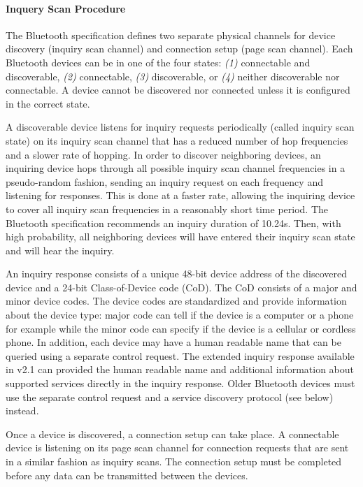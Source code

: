 \paragraph*{Inquery Scan Procedure}

The Bluetooth specification defines two separate physical channels for device discovery (inquiry scan channel) and connection setup (page scan channel).  Each Bluetooth devices can be in one of the four states: \emph{(1)} connectable and discoverable, \emph{(2)} connectable, \emph{(3)} discoverable, or \emph{(4)} neither discoverable nor connectable. A device cannot be discovered nor connected unless it is configured in the correct state.

A discoverable device listens for inquiry requests periodically (called inquiry scan state) on its inquiry scan channel that has a reduced number of hop frequencies and a slower rate of hopping. In order to discover neighboring devices, an inquiring device hops through all possible inquiry scan channel frequencies in a pseudo-random fashion, sending an inquiry request on each frequency and listening for responses. This is done at a faster rate, allowing the inquiring device to cover all inquiry scan frequencies in a reasonably short time period. The Bluetooth specification recommends an inquiry duration of 10.24s. Then, with high probability, all neighboring devices will
have entered their inquiry scan state and will hear the inquiry.

An inquiry response consists of a unique 48-bit device address of the discovered device and a 24-bit Class-of-Device code (CoD). The CoD consists of a major and minor device codes. The device codes are standardized and provide information about the device type: major code can tell if the device is a computer or a phone for example while the minor code can specify if the device is a cellular or cordless phone. In addition, each device may have a human readable name that can be queried using a separate control request. The extended inquiry response available in v2.1 can provided the human readable name and additional information about supported services directly in the inquiry response. Older Bluetooth devices must use the separate control request and a service discovery protocol (see below) instead.

Once a device is discovered, a connection setup can take place. A connectable device is listening on its page scan channel for connection requests that are sent in a similar fashion as inquiry scans. The connection setup must be completed before any data can be transmitted between the devices.

